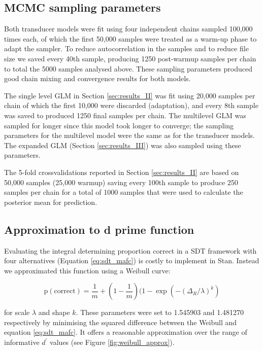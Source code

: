 \documentclass[11pt,a4paper]{article}
\begin{document}
{\subsection{MCMC sampling parameters}
\label{app:sampling}

Both transducer models were fit using four independent chains sampled 100,000 times each, of which the first 50,000 samples were treated as a warm-up phase to adapt the sampler.
To reduce autocorrelation in the samples and to reduce file size we saved every 40th sample, producing 1250 post-warmup samples per chain to total the 5000 samples analysed above.
These sampling parameters produced good chain mixing and convergence results for both models.

The single level GLM in Section \ref{sec:results_II} was fit using 20,000 samples per chain of which the first 10,000 were discarded (adaptation), and every 8th sample was saved to produced 1250 final samples per chain.
The multilevel GLM was sampled for longer since this model took longer to converge; the sampling parameters for the multilevel model were the same as for the transducer models.
The expanded GLM (Section \ref{sec:results_III}) was also sampled using these parameters.

The 5-fold crossvalidations reported in Section \ref{sec:results_II} are based on 50,000 samples (25,000 warmup) saving every 100th sample to produce 250 samples per chain for a total of 1000 samples that were used to calculate the posterior mean for prediction.

\subsection{Approximation to d prime function}
\label{app:dprime_approx}

Evaluating the integral determining proportion correct in a SDT framework with four alternatives (Equation \ref{eq:sdt_mafc}) is costly to implement in Stan.
Instead we approximated this function using a Weibull curve:

\begin{equation}
\label{eq:p_weibull}
\mathrm{p(correct)} = \frac{1}{m} + (1 - \frac{1}{m}) (1 - \exp( - (\Delta_R / \lambda)^k)
\end{equation}

for scale $\lambda$ and shape $k$.
These parameters were set to 1.545903 and 1.481270 respectively by minimising the squared difference between the Weibull and equation \ref{eq:sdt_mafc}.
It offers a reasonable approximation over the range of informative $d^\prime$ values (see Figure \ref{fig:weibull_approx}).

}
\end{document}
